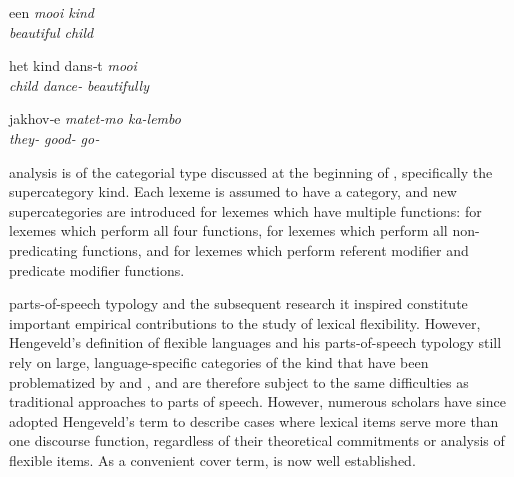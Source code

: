 \begin{exe}

  \ex\label{ex:2.3}
  \begin{xlist}

    \ex\label{ex:2.3a}
    \gll een        \em{mooi}      kind\\
          \em{beautiful} child\\

    \ex\label{ex:2.3b}
    \gll het      kind  dans‑t              \em{mooi}\\
          child dance‑ \em{beautifully}\\

  \end{xlist}

  \ex\label{ex:2.4}
  \vfix
  \gll jakhov‑e       \em{matet‑mo}         ka-lembo\\
       they‑ \em{good‑} go‑\\
  \vfix
  \hfill\hspace*{1em}\mbox{\footnotesize{}\normalsize}

\end{exe}

 analysis is of the categorial type discussed at the beginning of , specifically the supercategory kind. Each lexeme is assumed to have a category, and new supercategories are introduced for lexemes which have multiple functions:  for lexemes which perform all four functions,  for lexemes which perform all non-predicating functions, and  for lexemes which perform referent modifier and predicate modifier functions.

 parts-of-speech typology and the subsequent research it inspired \parencites{DonLier2013}{HengeveldRijkhoff2005}{Lier2006}{HengeveldLier2012}{Luuk2010}{LierRijkhoff2013}{Lier2016} constitute important empirical contributions to the study of lexical flexibility. However, Hengeveld's definition of flexible languages and his parts-of-speech typology still rely on large, language-specific categories of the kind that have been problematized by \textcite[§2.2.2]{Croft2001b} and \textcite{CroftLier2012}, and are therefore subject to the same difficulties as traditional approaches to parts of speech. However, numerous scholars have since adopted Hengeveld's term  to describe cases where lexical items serve more than one discourse function, regardless of their theoretical commitments or analysis of flexible items. As a convenient cover term,  is now well established.

